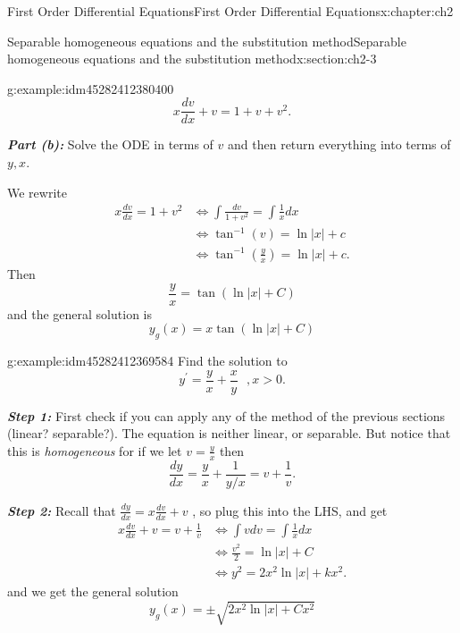 \documentclass[oneside,10pt,]{book}
\newcommand{\alert}[1]{\textbf{\textit{#1}}}
\numberwithin{equation}{section}
\numberwithin{equation}{section}
\newcommand{\amp}{&}
\begin{document}
\begin{chapterptx}{First Order Differential Equations}{}{First Order Differential Equations}{}{}{x:chapter:ch2}
\begin{sectionptx}{Separable homogeneous equations and the substitution method}{}{Separable homogeneous equations and the substitution method}{}{}{x:section:ch2-3}
\begin{example}{}{g:example:idm45282412380400}
\begin{equation*}
x\frac{dv}{dx}+v=1+v+v^{2}.
\end{equation*}
%
\par
\alert{Part (b):} Solve the ODE in terms of \(v\) and then return everything into terms of \(y,x\).%
\par
We rewrite%
\begin{align*}
x\frac{dv}{dx}=1+v^{2} \amp \iff\int\frac{dv}{1+v^{2}}=\int\frac{1}{x}dx\\
\amp \iff\tan^{-1}\left(v\right)=\ln\left|x\right|+c\\
\amp \iff\tan^{-1}\left(\frac{y}{x}\right)=\ln\left|x\right|+c.
\end{align*}
Then%
\begin{equation*}
\frac{y}{x}=\tan\left(\ln\left|x\right|+C\right)
\end{equation*}
and the general solution is%
\begin{equation*}
y_g(x)=x\tan\left(\ln\left|x\right|+C\right)
\end{equation*}
%
\end{example}
\begin{example}{}{g:example:idm45282412369584}%
Find the solution to%
\begin{equation*}
y^{\prime}=\frac{y}{x}+\frac{x}{y}\,\,\,\,,x>0.
\end{equation*}
%
\par
\alert{Step 1:} First check if you can apply any of the method of the previous sections (linear? separable?). The equation is neither linear, or separable. But notice that this is \emph{homogeneous} for if we let \(v=\frac{y}{x}\) then%
\begin{equation*}
\frac{dy}{dx}=\frac{y}{x}+\frac{1}{y/x}=v+\frac{1}{v}.
\end{equation*}
%
\par
\alert{Step 2:} Recall that \(\frac{dy}{dx}=x\frac{dv}{dx}+v\) , so plug this into the LHS, and get%
\begin{align*}
x\frac{dv}{dx}+v=v+\frac{1}{v} \amp \iff\int vdv=\int\frac{1}{x}dx\\
\amp \iff\frac{v^{2}}{2}=\ln\left|x\right|+C\\
\amp \iff y^{2}=2x^{2}\ln\left|x\right|+kx^{2}.
\end{align*}
and we get the general solution%
\begin{equation*}
y_g(x)=\pm\sqrt{2x^{2}\ln\left|x\right|+Cx^{2}}
\end{equation*}
%
\begin{sageinput}

\end{sageinput}
\end{example}
\end{sectionptx}
\end{chapterptx}
\end{document}
